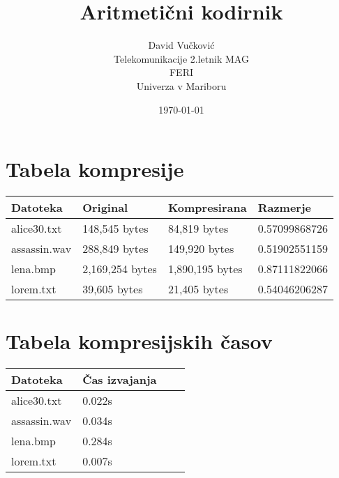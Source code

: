 \documentclass[12pt,a4paper]{article}
\title{\huge{\textbf{Aritmetični kodirnik}}}
\author{
        David Vučković \\
                Telekomunikacije 2.letnik MAG\\
        FERI\\
        Univerza v Mariboru}
\date{\today}
\begin{document}
\maketitle
\thispagestyle{empty}

\clearpage %


\thispagestyle{empty}

\clearpage %

\section{Tabela kompresije} %

\begin{table}[H]
\begin{tabular}{llll}
    Datoteka     & Original & Kompresirana & Razmerje \\ \hline
    alice30.txt  & 148,545 bytes                & 84,819 bytes          & 0.57099868726           \\
    assassin.wav & 288,849 bytes                & 149,920 bytes         & 0.51902551159           \\
    lena.bmp     & 2,169,254 bytes              & 1,890,195 bytes             & 0.87111822066           \\
    lorem.txt    & 39,605 bytes                      & 21,405 bytes            & 0.54046206287           \\
\end{tabular}
\end{table}
\section{Tabela  kompresijskih časov}
\begin{table}[H]
    \begin{tabular}{llll}
    Datoteka     & Čas izvajanja \\ \hline
    alice30.txt  & 0.022s              \\
    assassin.wav & 0.034s                      \\
    lena.bmp     & 0.284s              \\
    lorem.txt    & 0.007s                            \\
    \end{tabular}
\end{table}
\end{document}
